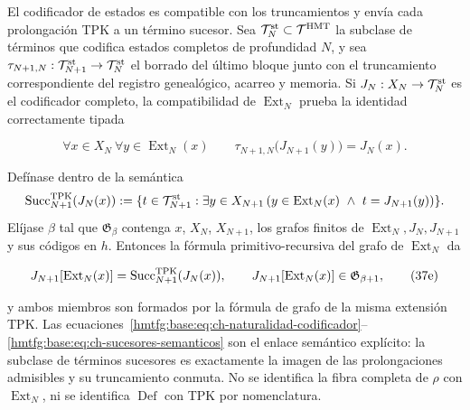 El codificador de estados es compatible con los truncamientos y envía cada
prolongación TPK a un término sucesor. Sea
\(\mathcal T_N^{\rm st}\subset\mathcal T^{\rm HMT}\) la subclase de términos
que codifica estados completos de profundidad \(N\), y sea
\(\tau_{N+1,N}:\mathcal T_{N+1}^{\rm st}\to\mathcal T_N^{\rm st}\) el borrado
del último bloque junto con el truncamiento correspondiente del registro genealógico,
acarreo y memoria. Si \(J_N:X_N\to\mathcal T_N^{\rm st}\) es el codificador
completo, la compatibilidad de \(\operatorname{Ext}_N\) prueba la identidad
correctamente tipada

\[
 \forall x\in X_N\ \forall y\in\operatorname{Ext}_N(x)\qquad
 \tau_{N+1,N}\bigl(J_{N+1}(y)\bigr)=J_N(x).
\tag{37e$_0$}\label{hmtfg:base:eq:ch-naturalidad-codificador}
\]

Defínase dentro de la semántica
\[
 \operatorname{Succ}^{\rm TPK}_{N+1}(J_N(x)):=
 \{t\in\mathcal T_{N+1}^{\rm st}:\exists y\in X_{N+1}\,
   (y\in\operatorname{Ext}_N(x)\ \wedge\ t=J_{N+1}(y))\}.
\]
Elíjase \(\beta\) tal que \(\mathfrak G_\beta\) contenga \(x\), \(X_N\),
\(X_{N+1}\), los grafos finitos de
\(\operatorname{Ext}_N,J_N,J_{N+1}\) y sus códigos en \(h\). Entonces la
fórmula primitivo-recursiva del grafo de \(\operatorname{Ext}_N\) da

\[
 J_{N+1}[\operatorname{Ext}_N(x)]
 =\operatorname{Succ}^{\rm TPK}_{N+1}(J_N(x)),
 \qquad
 J_{N+1}[\operatorname{Ext}_N(x)]
 \in\mathfrak G_{\beta+1},
\tag{37e}\label{hmtfg:base:eq:ch-sucesores-semanticos}
\]

y ambos miembros son formados por la fórmula de grafo de la misma extensión
TPK. Las ecuaciones~\eqref{hmtfg:base:eq:ch-naturalidad-codificador}--\eqref{hmtfg:base:eq:ch-sucesores-semanticos} son el enlace semántico explícito: la
subclase de términos sucesores es exactamente la imagen de las prolongaciones
admisibles y su truncamiento conmuta. No se identifica la fibra completa de
\(\rho\) con \(\operatorname{Ext}_N\), ni se identifica
\(\operatorname{Def}\) con TPK por nomenclatura.

